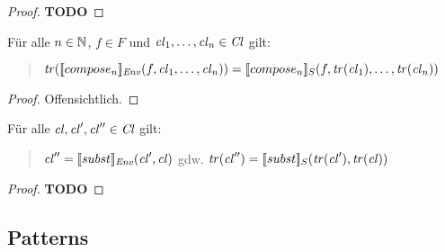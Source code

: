\documentclass[%
  12pt,%
  a4paper,%
]{article}
\begin{document}
\begin{proof}
  \textbf{TODO}
\end{proof}

\begin{lemma}
  F\"ur alle $n \in \mathbb N$, $f \in F$ und $\mathit{cl}_1,\ldots,\mathit{cl}_n \in \mathit{Cl}$ gilt:
  \begin{quote}
    $\mathit{tr}([\![compose_n]\!]_{\mathit{Env}}(f,\mathit{cl}_1,\ldots,\mathit{cl}_n)) = [\![compose_n]\!]_S(f,\mathit{tr}(\mathit{cl}_1),\ldots,\mathit{tr}(\mathit{cl}_n))$
  \end{quote}
\end{lemma}

\begin{proof}
  Offensichtlich.
\end{proof}

\begin{lemma}
  F\"ur alle $\mathit{cl},\mathit{cl}',\mathit{cl}''\in\mathit{Cl}$ gilt:
  \begin{quote}
    $\mathit{cl}'' = [\![subst]\!]_{\mathit{Env}}(\mathit{cl}',\mathit{cl})$ gdw. $\mathit{tr}(\mathit{cl}'') = [\![subst]\!]_S(\mathit{tr}(\mathit{cl}'),\mathit{tr}(\mathit{cl}))$
  \end{quote}
\end{lemma}

\begin{proof}
  \textbf{TODO}
\end{proof}


\subsection*{Patterns}
\end{document}
